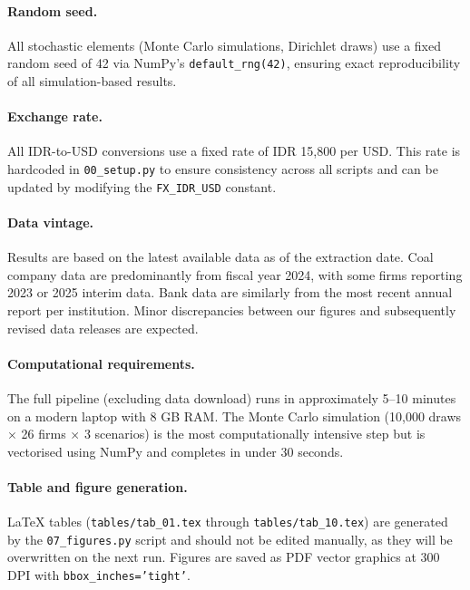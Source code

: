 \paragraph{Random seed.} All stochastic elements (Monte Carlo simulations, Dirichlet draws) use a fixed random seed of 42 via NumPy's \texttt{default\_rng(42)}, ensuring exact reproducibility of all simulation-based results.

\paragraph{Exchange rate.} All IDR-to-USD conversions use a fixed rate of IDR 15,800 per USD. This rate is hardcoded in \texttt{00\_setup.py} to ensure consistency across all scripts and can be updated by modifying the \texttt{FX\_IDR\_USD} constant.

\paragraph{Data vintage.} Results are based on the latest available data as of the extraction date. Coal company data are predominantly from fiscal year 2024, with some firms reporting 2023 or 2025 interim data. Bank data are similarly from the most recent annual report per institution. Minor discrepancies between our figures and subsequently revised data releases are expected.

\paragraph{Computational requirements.} The full pipeline (excluding data download) runs in approximately 5--10 minutes on a modern laptop with 8 GB RAM. The Monte Carlo simulation (10,000 draws $\times$ 26 firms $\times$ 3 scenarios) is the most computationally intensive step but is vectorised using NumPy and completes in under 30 seconds.

\paragraph{Table and figure generation.} LaTeX tables (\texttt{tables/tab\_01.tex} through \texttt{tables/tab\_10.tex}) are generated by the \texttt{07\_figures.py} script and should not be edited manually, as they will be overwritten on the next run. Figures are saved as PDF vector graphics at 300 DPI with \texttt{bbox\_inches='tight'}.
